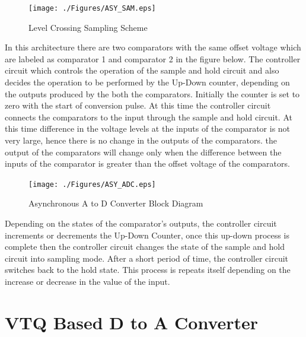 \begin{figure}[ht]
\begin{center}
\texttt{[image: ./Figures/ASY\_SAM.eps]}
\caption{Level Crossing Sampling Scheme }
\label{fig:ASY_SAM}
\end{center}
\end{figure}


\par
\hspace{0.5cm} In this architecture there are two comparators with the same offset voltage which are labeled as comparator 1 and comparator 2 in the figure below. The controller circuit which controls the operation of the sample and hold circuit and also decides the operation to be performed by the Up-Down counter, depending on the outputs produced by the both the comparators. Initially the counter is set to zero with the start of conversion pulse. At this time the controller circuit connects the comparators to the input through the sample and hold circuit. At this time difference in the voltage levels at the inputs of the comparator is not very large, hence there is no change in the outputs of the comparators. the output of the comparators will change only when the difference between the inputs of the comparator is greater than the offset voltage of the comparators.\\

\begin{figure}[ht]
\begin{center}
\texttt{[image: ./Figures/ASY\_ADC.eps]}
\caption{Asynchronous A to D Converter Block Diagram }
\label{fig:ASY_ADC}
\end{center}
\end{figure}

\par
\hspace{0.5cm} Depending on the states of the comparator's outputs, the controller circuit increments or decrements the Up-Down Counter, once this up-down process is complete then the controller circuit changes the state of the  sample and hold circuit into sampling mode. After a short period of time, the controller circuit switches back to the hold state. This process is repeats itself depending on the increase or decrease in the value of the input. \\

\section{VTQ Based D to A Converter}

